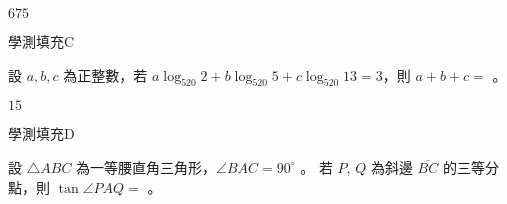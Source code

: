 \begin{QUESTIONS}
\begin{QUESTION}
        \begin{QTAGS}\end{QTAGS}
        \begin{QANS}
            $675$
        \end{QANS}
        \begin{QSOLLIST}
        \end{QSOLLIST}
        \begin{QEMPTYSPACE}
        \end{QEMPTYSPACE}
    \end{QUESTION}
    \begin{QUESTION}
        \begin{ExamInfo}{93}{學測}{填充}{C}
        \end{ExamInfo}
        \begin{ExamAnsRateInfo}{36}{77}{27}{4}
        \end{ExamAnsRateInfo}
        \begin{QBODY}
            設 $a,b,c$ 為正整數，若 $a\log_{520} 2+b\log_{520} 5+c\log_{520}13=3$，則 $a+b+c=$ 
            \TCNBOX{} 。
        \end{QBODY}
        \begin{QFROMS}
        \end{QFROMS}
        \begin{QTAGS}\end{QTAGS}
        \begin{QANS}
            $15$
        \end{QANS}
        \begin{QSOLLIST}
        \end{QSOLLIST}
        \begin{QEMPTYSPACE}
        \end{QEMPTYSPACE}
    \end{QUESTION}
    \begin{QUESTION}
        \begin{ExamInfo}{93}{學測}{填充}{D}
        \end{ExamInfo}
        \begin{ExamAnsRateInfo}{19}{45}{8}{4}
        \end{ExamAnsRateInfo}
        \begin{QBODY}
            設 $\triangle ABC$ 為一等腰直角三角形，$\angle BAC = 90^\circ$ 。
            若 $P$, $Q$ 為斜邊 $\overline{BC}$ 的三等分點，則 $\tan \angle PAQ = $
            \TCNBOX{\TCN\TCN} 。
        \end{QBODY}

\end{QUESTION}
\end{QUESTIONS}

